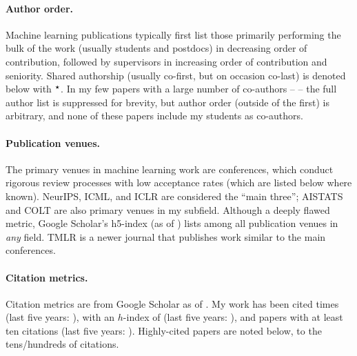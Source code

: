 \documentclass[10pt]{article}
\begin{document}
\paragraph{Author order.} Machine learning publications typically first list those primarily performing the bulk of the work (usually students and postdocs) in decreasing order of contribution,
followed by supervisors in increasing order of contribution and seniority.
Shared authorship (usually co-first, but on occasion co-last) is denoted below with $^{\boldsymbol\star}$.
In my few papers with a large number of co-authors -- \lotsoauths{} -- the full author list is suppressed for brevity,
but author order (outside of the first) is arbitrary, and none of these papers include my students as co-authors.

\paragraph{Publication venues.} The primary venues in machine learning work are conferences,
which conduct rigorous review processes with low acceptance rates (which are listed below where known).
NeurIPS, ICML, and ICLR are considered the ``main three'';
AISTATS and COLT are also primary venues in my subfield.
Although a deeply flawed metric, Google Scholar's h5-index (as of \citeupdatedate{}) lists \hfiveinfo{} among all publication venues in \emph{any} field.
TMLR is a newer journal that publishes work similar to the main conferences.

\paragraph{Citation metrics.}
Citation metrics are from Google Scholar as of \citeupdatedate{}.
My work has been cited \totalcites{} times (last five years: \totalcitesrec{}),
with an $h$-index of \hindex{} (last five years: \hindexrec{}),
and \itenindex{} papers with at least ten citations (last five years: \itenindexrec{}).
Highly-cited papers are noted below, to the tens/hundreds of citations.

\end{document}
